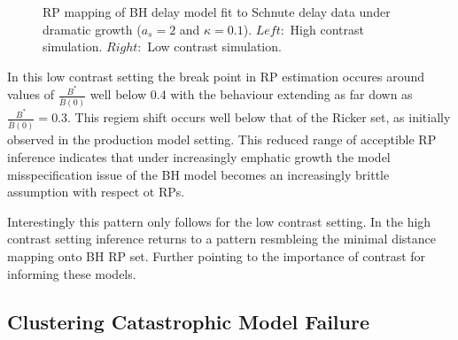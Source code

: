 \begin{figure}[h!]
\begin{minipage}[h!]{0.09\textwidth}
\end{minipage}
\caption{
RP mapping of BH delay model fit to Schnute delay data under dramatic growth ($a_s=2$ and $\kappa=0.1$).
$Left:$ High contrast simulation.
$Right:$ Low contrast simulation.
}\label{dramaticGrowth}
\end{figure}
%
In this low contrast setting the break point in RP estimation occures around values of
$\frac{B^*}{\bar B(0)}$ well below 0.4 with the behaviour extending as far down as 
$\frac{B^*}{\bar B(0)}=0.3$. This regiem shift occurs well below that of the Ricker
set, as initially observed in the production model setting.
This reduced range of acceptible RP inference indicates that under increasingly
emphatic growth
the model misspecification issue of the BH model becomes an
increasingly brittle assumption with respect ot RPs.

%
Interestingly this pattern only follows for the low contrast setting. In the high
contrast setting inference returns to a pattern resmbleing the minimal distance
mapping onto BH RP set. Further pointing to the importance of contrast for informing
these models.

%

%
\subsection{Clustering Catastrophic Model Failure}

